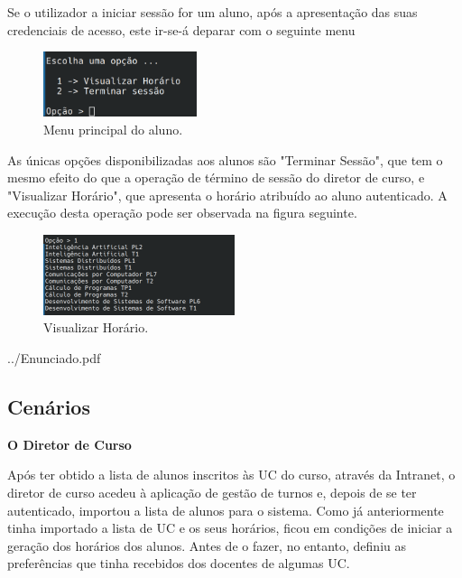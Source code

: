 \documentclass[12pt, a4paper]{article}
\makeatletter
\renewcommand\section[1]{
    \newpage
    \thispagestyle{empty}
    \vspace*{\fill}
    \@startsection{section}{1}{\z@}{0px}{50px}{\normalfont\Huge\bfseries}{#1}
    \vspace*{\fill}
    \newpage
}
\makeatother
\begin{document}
Se o utilizador a iniciar sessão for um aluno, após a apresentação das suas credenciais de acesso,
este ir-se-á deparar com o seguinte menu 

\begin{figure}[H]
    \centering
    \includegraphics[width=0.4\textwidth]{Imagens/Manual/Aluno.png}
    \caption{Menu principal do aluno.}
\end{figure}

As únicas opções disponibilizadas aos alunos são "Terminar Sessão", que tem o mesmo efeito do que a
operação de término de sessão do diretor de curso, e "Visualizar Horário", que apresenta o horário
atribuído ao aluno autenticado. A execução desta operação pode ser observada na figura seguinte.

\begin{figure}[H]
    \centering
    \includegraphics[width=0.5\textwidth]{Imagens/Manual/Aluno-1.png}
    \caption{Visualizar Horário.}
\end{figure}

\section{Anexos}


    {../Enunciado.pdf}


\subsection{Cenários}
\label{use-cases}

\textbf{O Diretor de Curso}

Após ter obtido a lista de alunos inscritos às UC do curso, através da Intranet, o diretor de curso
acedeu à aplicação de gestão de turnos e, depois de se ter autenticado, importou a lista de alunos
para o sistema. Como já anteriormente tinha importado a lista de UC e os seus horários, ficou em
condições de iniciar a geração dos horários dos alunos. Antes de o fazer, no entanto, definiu as
preferências que tinha recebidos dos docentes de algumas UC.
\end{document}
